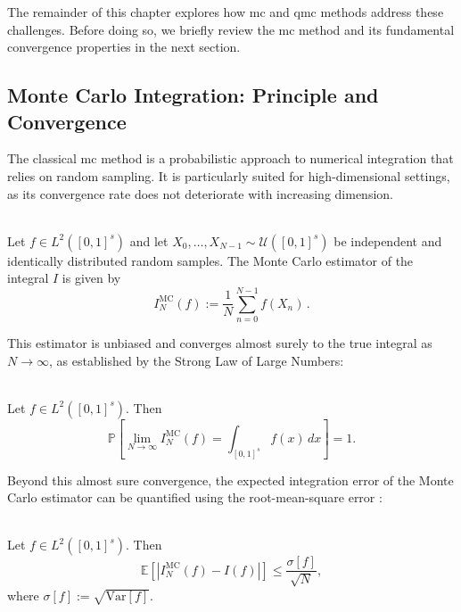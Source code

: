 The remainder of this chapter explores how \ac{mc} and \ac{qmc} methods address
these challenges. Before doing so, we briefly review the \ac{mc} method and
its fundamental convergence properties in the next section.


\subsection{Monte Carlo Integration: Principle and Convergence}
The classical \ac{mc} method is a probabilistic approach to numerical
integration that relies on random sampling. It is particularly suited for
high-dimensional settings, as its convergence rate does not deteriorate with
increasing dimension.

\begin{definition} \ \\
Let $f \in L^2([0,1]^s)$ and let $X_0, \dots, X_{N-1} \sim
\mathcal{U}([0,1]^s)$ be independent and identically distributed random samples.
The Monte Carlo estimator of the integral \( I \) is given by
\begin{equation}
    I_N^{\mathrm{MC}}(f) := \frac{1}{N} \sum_{n=0}^{N-1} f(X_n)\,.
\end{equation}
\end{definition}


This estimator is unbiased and converges almost surely to the true integral as $N \to \infty$, as established by the Strong Law of Large Numbers:

\begin{theorem} \ \\
Let $f \in L^2([0,1]^s)$. Then
\begin{equation}
\mathbb{P}\left[ \lim_{N \to \infty} I_N^{\mathrm{MC}}(f) = \int_{[0,1]^s} f(x)\, dx \right] = 1.
\end{equation}
\end{theorem}

Beyond this almost sure convergence, the expected integration error of the Monte
Carlo estimator can be quantified using the root-mean-square error \cite[Section 1.3]{pillichshammer2010zahlentheoretische}:

\begin{theorem} \ \\
\label{thm:mc-convergence-rate}
Let $f \in L^2([0,1]^s)$. Then
\begin{equation}
    \mathbb{E}\left[ \left| I_N^{\mathrm{MC}}(f) - I(f) \right| \right] \leq \frac{\sigma[f]}{\sqrt{N}},
\end{equation}
where $\sigma[f] := \sqrt{\mathrm{Var}[f]}$.
\end{theorem}

